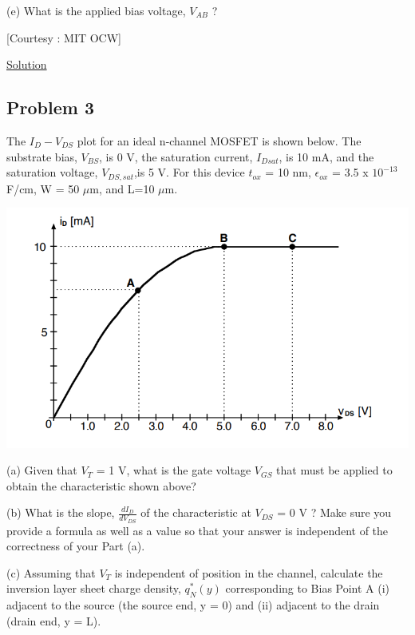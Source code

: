 \documentclass[12 pt]{article}
\begin{document}
(e) What is the applied bias voltage, $V_{AB}$ ? \par

\hspace{11 cm} [Courtesy : MIT OCW]

\href{https://drive.google.com/file/d/19M9PUuE1QOvwd1e1w2vkUlPLHjnA2qOI/view?usp=sharing}{Solution}

\subsection{Problem 3}

The $I_{D}-V_{DS}$ plot for an ideal n-channel MOSFET is shown below. The substrate bias, $V_{BS}$, is 0 V, the saturation current, $I_{Dsat}$, is 10 mA, and the saturation voltage, $V_{DS,sat}$,is 5 V. For this device $t_{ox}$ = 10 nm, $\epsilon_{ox}$ = 3.5 x $10^{-13}$ F/cm, W = 50 $\mu$m, and L=10 $\mu$m. 

\par
\begin{center}
    \includegraphics{MOSFET_IV.png}
\end{center}
\par

(a) Given that $V_{T}$ = 1 V, what is the gate voltage $V_{GS}$ that must be applied to obtain the characteristic shown above? \par

(b) What is the slope, $\frac{dI_{D}}{dV_{DS}}$ of the characteristic at $V_{DS}$ = 0 V ? Make sure you provide a formula as well as a value so that your answer is independent of the correctness of your Part (a). \par

(c) Assuming that $V_{T}$ is independent of position in the channel, calculate the inversion layer sheet charge density, $q_{N}^{*}(y)$ corresponding to Bias Point A (i) adjacent to the source (the source end, y = 0) and (ii) adjacent to the drain (drain end, y = L). \par
\end{document}
